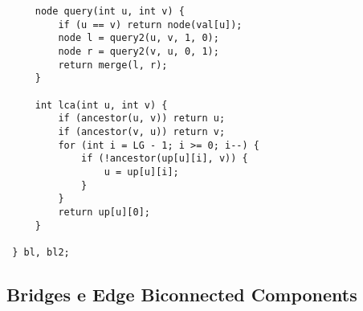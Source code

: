 \documentclass[11pt, a4paper, twoside]{article}
\begin{document}
\begin{lstlisting}
     node query(int u, int v) {
         if (u == v) return node(val[u]);
         node l = query2(u, v, 1, 0);
         node r = query2(v, u, 0, 1);
         return merge(l, r);
     }
 
     int lca(int u, int v) {
         if (ancestor(u, v)) return u;
         if (ancestor(v, u)) return v;
         for (int i = LG - 1; i >= 0; i--) {
             if (!ancestor(up[u][i], v)) {
                 u = up[u][i];
             }
         }
         return up[u][0];
     }
 
 } bl, bl2;
\end{lstlisting}

\subsection{Bridges e Edge Biconnected Components}
\end{document}
